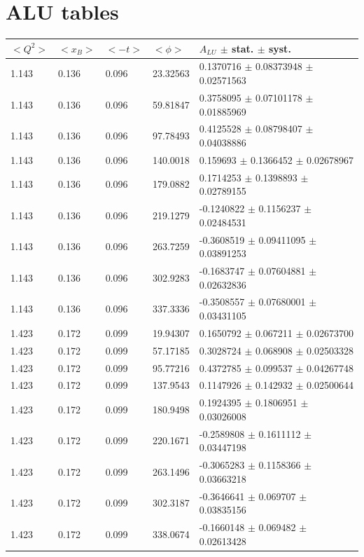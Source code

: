 \section*{ALU tables}
\begin{table}[!h]
   \begin{center}
      \begin{tabular}{||l|l|l|l|l||}
         \hline
 $<Q^{2}>$ & $<x_{B}>$ & $<-t>$ & $<\phi>$ & $A_{LU}$ $\pm$ stat. $\pm$ syst.\\
         \hline
         1.143 & 0.136 & 0.096 &  23.32563   &    0.1370716  $\pm$   0.08373948  $\pm$   0.02571563 \\
         1.143 & 0.136 & 0.096 &  59.81847   &    0.3758095  $\pm$   0.07101178  $\pm$   0.01885969 \\
         1.143 & 0.136 & 0.096 &  97.78493   &    0.4125528  $\pm$   0.08798407  $\pm$   0.04038886 \\
         1.143 & 0.136 & 0.096 &  140.0018   &    0.159693   $\pm$   0.1366452   $\pm$   0.02678967 \\
         1.143 & 0.136 & 0.096 &  179.0882   &    0.1714253  $\pm$   0.1398893   $\pm$   0.02789155 \\
         1.143 & 0.136 & 0.096 &  219.1279   &   -0.1240822  $\pm$   0.1156237   $\pm$   0.02484531 \\
         1.143 & 0.136 & 0.096 &  263.7259   &   -0.3608519  $\pm$   0.09411095  $\pm$   0.03891253 \\
         1.143 & 0.136 & 0.096 &  302.9283   &   -0.1683747  $\pm$   0.07604881  $\pm$   0.02632836 \\
         1.143 & 0.136 & 0.096 &  337.3336   &   -0.3508557  $\pm$   0.07680001  $\pm$   0.03431105 \\
         \hline                                                                          
         1.423 & 0.172 & 0.099 &  19.94307   &    0.1650792  $\pm$   0.067211    $\pm$   0.02673700 \\
         1.423 & 0.172 & 0.099 &  57.17185   &    0.3028724  $\pm$   0.068908    $\pm$   0.02503328 \\
         1.423 & 0.172 & 0.099 &  95.77216   &    0.4372785  $\pm$   0.099537    $\pm$   0.04267748 \\
         1.423 & 0.172 & 0.099 &  137.9543   &    0.1147926  $\pm$   0.142932    $\pm$   0.02500644 \\
         1.423 & 0.172 & 0.099 &  180.9498   &    0.1924395  $\pm$   0.1806951   $\pm$   0.03026008 \\
         1.423 & 0.172 & 0.099 &  220.1671   &   -0.2589808  $\pm$   0.1611112   $\pm$   0.03447198 \\
         1.423 & 0.172 & 0.099 &  263.1496   &   -0.3065283  $\pm$   0.1158366   $\pm$   0.03663218 \\
         1.423 & 0.172 & 0.099 &  302.3187   &   -0.3646641  $\pm$   0.069707    $\pm$   0.03835156 \\
         1.423 & 0.172 & 0.099 &  338.0674   &   -0.1660148  $\pm$   0.069482    $\pm$   0.02613428 \\
         \hline
                                                                        

\end{tabular}
\end{center}
\end{table}

